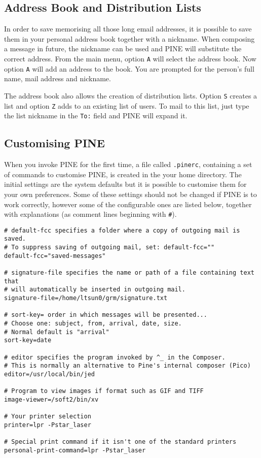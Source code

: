 \subsection{Address Book and Distribution Lists}

In order to save memorising all those long email addresses, it is
possible to save them in your personal address book together with a
nickname.  When composing a message in future, the nickname can be used
and PINE will substitute the correct address. From the main menu,
option {\tt A} will select the address book. Now option {\tt A} will
add an address to the book. You are prompted for the person's full
name, mail address and nickname.

The address book also allows the creation of distribution lists.
Option {\tt S} creates a list and option {\tt Z} adds to an existing
list of users. To mail to this list, just type the list nickname in the
{\tt To:} field and PINE will expand it.

\subsection{Customising PINE}
\label{sec-cust}

When you invoke PINE for the first time, a file called {\tt .pinerc},
containing a set of commands to customise PINE, is created in the your
home directory. The initial settings are the system defaults but it is
possible to customise them for your own preferences.  Some of these
settings should not be changed if PINE is to work correctly, however
some of the configurable ones are listed below, together with
explanations (as comment lines beginning with {\tt \#}).

\begin{small}
\begin{verbatim} 
# default-fcc specifies a folder where a copy of outgoing mail is saved.  
# To suppress saving of outgoing mail, set: default-fcc=""
default-fcc="saved-messages"

# signature-file specifies the name or path of a file containing text that 
# will automatically be inserted in outgoing mail.
signature-file=/home/ltsun0/grm/signature.txt

# sort-key= order in which messages will be presented...  
# Choose one: subject, from, arrival, date, size.  
# Normal default is "arrival"
sort-key=date

# editor specifies the program invoked by ^_ in the Composer.
# This is normally an alternative to Pine's internal composer (Pico)
editor=/usr/local/bin/jed
 
# Program to view images if format such as GIF and TIFF
image-viewer=/soft2/bin/xv

# Your printer selection
printer=lpr -Pstar_laser
 
# Special print command if it isn't one of the standard printers
personal-print-command=lpr -Pstar_laser
\end{verbatim}
\end{small}


